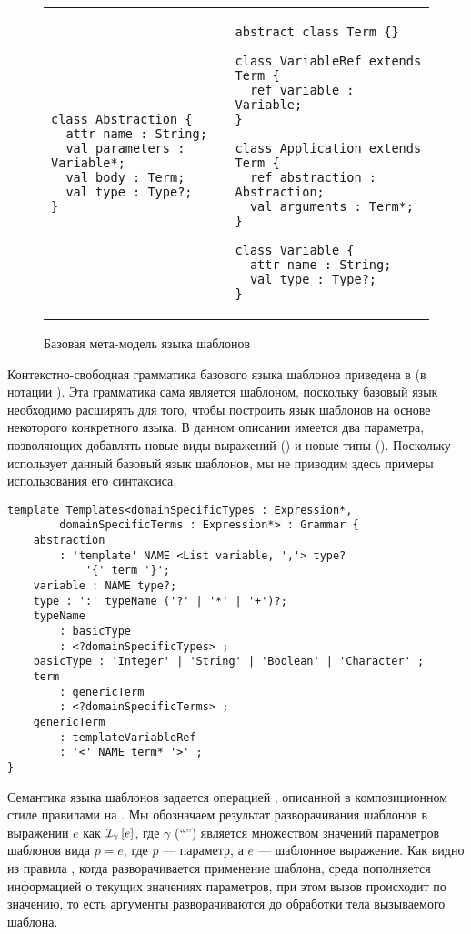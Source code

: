 {\begin{figure}[htbp]
\begin{tabular}{p{}p{}}
\begin{lstlisting}[xleftmargin=0cm]
class Abstraction {
  attr name : String;
  val parameters : Variable*;
  val body : Term;
  val type : Type?;
}

\end{lstlisting}
&
\begin{lstlisting}[xleftmargin=0cm]
abstract class Term {}

class VariableRef extends Term {
  ref variable : Variable;
}

class Application extends Term {
  ref abstraction : Abstraction;
  val arguments : Term*;
}

class Variable {
  attr name : String;
  val type : Type?;
}
\end{lstlisting}
\end{tabular}
	\caption{Базовая мета-модель языка шаблонов}\label{TempMM}
\end{figure}

Контекстно-свободная грамматика базового языка шаблонов приведена в  (в нотации \GRM{}). Эта грамматика сама является шаблоном, поскольку базовый язык необходимо расширять для того, чтобы построить язык шаблонов на основе некоторого конкретного языка. В данном описании имеется два параметра, позволяющих добавлять новые виды выражений () и новые типы (). Поскольку \GRM{} использует данный базовый язык шаблонов, мы не приводим здесь примеры использования его синтаксиса.

\begin{lstlisting}[label=TempG,float=htbp,caption=Базовый синтаксис языка шаблонов]
template Templates<domainSpecificTypes : Expression*, 
		domainSpecificTerms : Expression*> : Grammar {
	abstraction 
		: 'template' NAME <List variable, ','> type? 
			'{' term '}';
	variable : NAME type?;
	type : ':' typeName ('?' | '*' | '+')?;
	typeName
		: basicType
		: <?domainSpecificTypes> ;
	basicType : 'Integer' | 'String' | 'Boolean' | 'Character' ;
	term
		: genericTerm
		: <?domainSpecificTerms> ;
	genericTerm
		: templateVariableRef
		: '<' NAME term* '>' ;
}
\end{lstlisting}

Семантика языка шаблонов задается операцией , описанной в композиционном стиле правилами на . Мы обозначаем результат разворачивания шаблонов в выражении $e$ как $\mathcal{I}_{\gamma} \left[ e \right]$, где $\gamma$ (``'') является множеством значений параметров шаблонов вида $p = e$, где $p$ --- параметр, а $e$ --- шаблонное выражение. Как видно из правила , когда разворачивается применение шаблона, среда пополняется информацией о текущих значениях параметров, при этом вызов происходит по значению, то есть аргументы разворачиваются до обработки тела вызываемого шаблона. 

}
